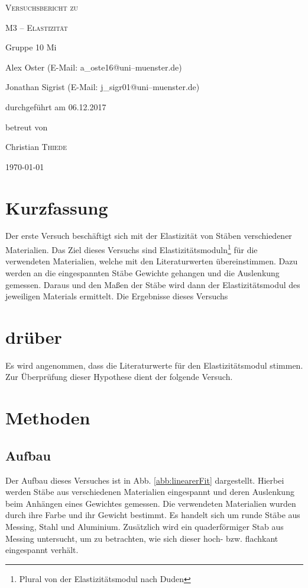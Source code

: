 \documentclass[11pt,a4paper,titlepage, ngerman]{article}
\begin{document}
	\begin{titlepage}
		\centering
		{\scshape\LARGE Versuchsbericht zu \par}
		\vspace{1cm}
		{\scshape\huge M3 -- Elastizität\par}
		\vspace{2.5cm}
		{\LARGE Gruppe 10 Mi\par}
		\vspace{0.5cm}
		{\large Alex Oster (E-Mail: a\_oste16@uni--muenster.de) \par}
		{\large Jonathan Sigrist (E-Mail: j\_sigr01@uni--muenster.de) \par}
		\vfill
		durchgeführt am 06.12.2017\par
		betreut von\par
		{\large Christian \textsc{Thiede}}		
		\vfill	
		{\large \today\par}
	\end{titlepage}
		
	\tableofcontents
		
	\newpage
	
	\section{Kurzfassung}
		
		Der erste Versuch beschäftigt sich mit der Elastizität von Stäben verschiedener Materialien. Das Ziel dieses Versuchs sind Elastizitätsmoduln\footnote{Plural von \glqq der Elastizitätsmodul\grqq {} nach Duden} für die verwendeten Materialien, welche mit den Literaturwerten übereinstimmen. Dazu werden an die eingespannten Stäbe Gewichte gehangen und die Auslenkung gemessen. Daraus und den Maßen der Stäbe wird dann der Elastizitätsmodul des jeweiligen Materials ermittelt. Die Ergebnisse dieses Versuchs %
	
	\section*{drüber}
	
		Es wird angenommen, dass die Literaturwerte für den Elastizitätsmodul stimmen. Zur Überprüfung dieser Hypothese dient der folgende Versuch.		
		
	\section{Methoden}
		
		\subsection*{Aufbau}
		Der Aufbau dieses Versuches ist in Abb. \ref{abb:linearerFit} dargestellt. Hierbei werden Stäbe aus verschiedenen Materialien eingespannt und deren Auslenkung beim Anhängen eines Gewichtes gemessen. 
		Die verwendeten Materialien wurden durch ihre Farbe und ihr Gewicht bestimmt. Es handelt sich um runde Stäbe aus Messing, Stahl und Aluminium. Zusätzlich wird ein quaderförmiger Stab aus Messing untersucht, um zu betrachten, wie sich dieser hoch- bzw. flachkant eingespannt verhält.
		
\end{document}
